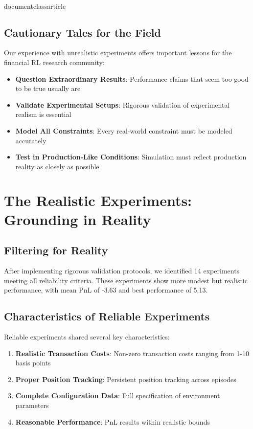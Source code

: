 \\documentclass{article}
\begin{document}
\subsection{Cautionary Tales for the Field}

Our experience with unrealistic experiments offers important lessons for the financial RL research community:

\begin{itemize}
\item \textbf{Question Extraordinary Results}: Performance claims that seem too good to be true usually are
\item \textbf{Validate Experimental Setups}: Rigorous validation of experimental realism is essential
\item \textbf{Model All Constraints}: Every real-world constraint must be modeled accurately
\item \textbf{Test in Production-Like Conditions}: Simulation must reflect production reality as closely as possible
\end{itemize}
\n\n
\section{The Realistic Experiments: Grounding in Reality}

\subsection{Filtering for Reality}


After implementing rigorous validation protocols, we identified 14 experiments meeting all reliability criteria. These experiments show more modest but realistic performance, with mean PnL of -3.63 and best performance of 5.13.

\subsection{Characteristics of Reliable Experiments}

Reliable experiments shared several key characteristics:

\begin{enumerate}
\item \textbf{Realistic Transaction Costs}: Non-zero transaction costs ranging from 1-10 basis points
\item \textbf{Proper Position Tracking}: Persistent position tracking across episodes
\item \textbf{Complete Configuration Data}: Full specification of environment parameters
\item \textbf{Reasonable Performance}: PnL results within realistic bounds
\end{enumerate}
\end{document}
